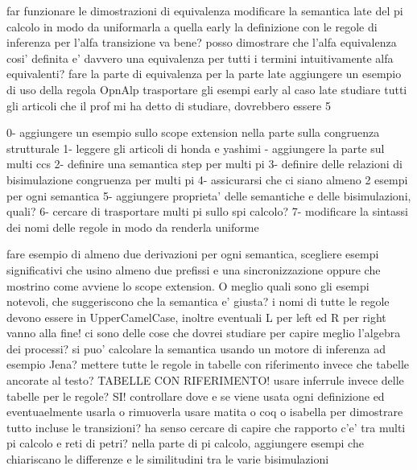 
far funzionare le dimostrazioni di equivalenza
modificare la semantica late del pi calcolo in modo da uniformarla a quella early
la definizione con le regole di inferenza per l'alfa transizione va bene? posso dimostrare che l'alfa equivalenza cosi' definita e' davvero una equivalenza per tutti i termini intuitivamente alfa equivalenti?
fare la parte di equivalenza per la parte late
aggiungere un esempio di uso della regola OpnAlp
trasportare gli esempi early al caso late
studiare tutti gli articoli che il prof mi ha detto di studiare, dovrebbero essere 5



0- aggiungere un esempio sullo scope extension nella parte sulla congruenza strutturale
1- leggere gli articoli di honda e yashimi
 - aggiungere la parte sul multi ccs
2- definire una semantica step per multi pi
3- definire delle relazioni di bisimulazione congruenza per multi pi
4- assicurarsi che ci siano almeno 2 esempi per ogni semantica
5- aggiungere proprieta' delle semantiche e delle bisimulazioni, quali?
6- cercare di trasportare multi pi sullo spi calcolo?
7- modificare la sintassi dei nomi delle regole in modo da renderla uniforme


fare esempio di almeno due derivazioni per ogni semantica, scegliere esempi significativi che usino almeno due prefissi e una sincronizzazione oppure che mostrino come avviene lo scope extension.
O meglio quali sono gli esempi notevoli, che suggeriscono che la semantica e' giusta?
i nomi di tutte le regole devono essere in UpperCamelCase, inoltre eventuali L per left ed R per right vanno alla fine!
ci sono delle cose che dovrei studiare per capire meglio l'algebra dei processi?
si puo' calcolare la semantica usando un motore di inferenza ad esempio Jena?
mettere tutte le regole in tabelle con riferimento invece che tabelle ancorate al testo? TABELLE CON RIFERIMENTO!
usare inferrule invece delle tabelle per le regole? SI!
controllare dove e se viene usata ogni definizione ed eventuaelmente usarla o rimuoverla
usare matita o coq o isabella per dimostrare tutto incluse le transizioni?
ha senso cercare di capire che rapporto c'e' tra multi pi calcolo e reti di petri?
nella parte di pi calcolo, aggiungere esempi che chiariscano le differenze e le similitudini tra le varie bisimulazioni



